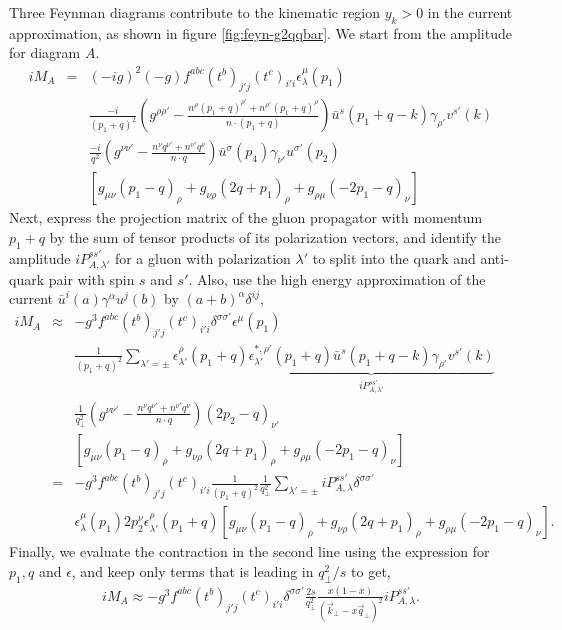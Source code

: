 Three Feynman diagrams contribute to the kinematic region $y_k >0$ in the current approximation, as shown in figure \ref{fig:feyn-g2qqbar}.
We start from the amplitude for diagram $A$.
\begin{eqnarray}
i M_A &=& (-ig)^2(-g)f^{abc}(t^b)_{j'j}(t^c)_{i'i} \epsilon_\lambda^\mu(p_1) \\\nonumber
&&\frac{-i}{(p_1+q)^2}\left(g^{\rho\rho'}-\frac{n^{\rho}(p_1+q)^{\rho'}+n^{\rho'}(p_1+q)^\rho}{n\cdot (p_1+q)}\right) \bar{u}^s(p_1+q-k)\gamma_{\rho'}v^{s'}(k) \\ \nonumber
&&\frac{-i}{q^2}\left(g^{\nu\nu'}-\frac{n^{\nu}q^{\nu'}+n^{\nu'}q^\nu}{n\cdot q}\right) \bar{u}^{\sigma}(p_4)\gamma_{\nu'}u^{\sigma'}(p_2) \\ \nonumber
&& \left[g_{\mu\nu}(p_1-q)_\rho + g_{\nu\rho}(2q+p_1)_\rho + g_{\rho\mu}(-2p_1 -q)_\nu \right]
\end{eqnarray}
Next, express the projection matrix of the gluon propagator with momentum $p_1+q$ by the sum of tensor products of its polarization vectors, and identify the amplitude $iP_{A,\lambda'}^{ss'}$ for a gluon with polarization $\lambda'$ to split into the quark and anti-quark pair with spin $s$ and $s'$.
Also, use the high energy approximation of the current $\bar{u}^i(a)\gamma^\alpha u^j(b)$ by $(a+b)^\alpha \delta^{ij}$,
\begin{eqnarray}
i M_A &\approx& -g^3 f^{abc}(t^b)_{j'j}(t^c)_{i'i} \delta^{\sigma\sigma'} \epsilon^\mu(p_1) \\\nonumber
&&\frac{1}{(p_1+q)^2} \sum_{\lambda'=\pm}\epsilon_{\lambda'}^{\rho}(p_1+q)\underbrace{\epsilon_{\lambda'}^{*,\rho'}(p_1+q) \bar{u}^s(p_1+q-k)\gamma_{\rho'}v^{s'}(k)}_{iP_{A,\lambda'}^{ss'}} \\ \nonumber
&&\frac{1}{q_\perp^2}\left(g^{\nu\nu'}-\frac{n^{\nu}q^{\nu'}+n^{\nu'}q^\nu}{n\cdot q}\right) (2p_2-q)_{\nu'} \\ \nonumber
&& \left[g_{\mu\nu}(p_1-q)_\rho + g_{\nu\rho}(2q+p_1)_\rho + g_{\rho\mu}(-2p_1 -q)_\nu \right] \\
&=& -g^3 f^{abc}(t^b)_{j'j}(t^c)_{i'i} \frac{1}{(p_1+q)^2}\frac{1}{q_\perp^2} \sum_{\lambda'=\pm}iP_{A,\lambda}^{ss'} \delta^{\sigma\sigma'}  \\ \nonumber
&& \epsilon_\lambda^\mu(p_1)2p_2^{\nu} \epsilon_{\lambda'}^{\rho}(p_1+q) \left[g_{\mu\nu}(p_1-q)_\rho + g_{\nu\rho}(2q+p_1)_\rho + g_{\rho\mu}(-2p_1 -q)_\nu \right].
\end{eqnarray}
Finally, we evaluate the contraction in the second line using the expression for $p_1, q$ and $\epsilon$, and keep only terms that is leading in $q_\perp^2/s$ to get,
\begin{eqnarray}
i M_A \approx -g^3 f^{abc}(t^b)_{j'j}(t^c)_{i'i}\delta^{\sigma\sigma'}\frac{2s}{q_\perp^2} \frac{x(1-x)}{(\vec{k}_\perp-x \vec{q}_\perp)^2} iP_{A,\lambda}^{ss'}.
\end{eqnarray}

